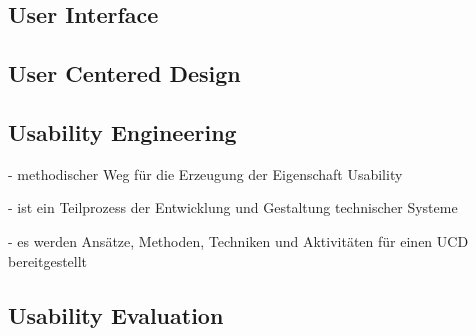 \subsection{User Interface}

\subsection{User Centered Design}

\subsection{Usability Engineering}

- methodischer Weg für die Erzeugung der Eigenschaft Usability

- ist ein Teilprozess der Entwicklung und Gestaltung technischer Systeme

- es werden Ansätze, Methoden, Techniken und Aktivitäten für einen UCD bereitgestellt

\subsection{Usability Evaluation}
